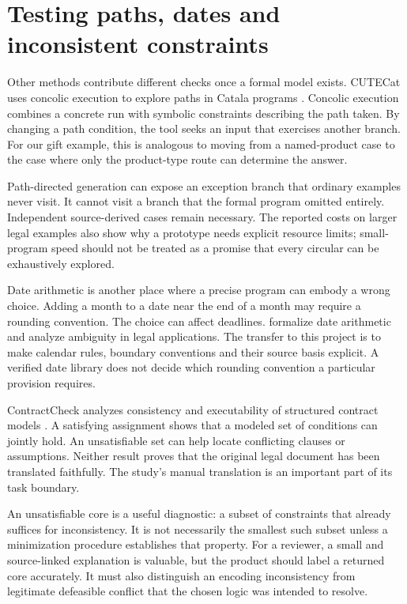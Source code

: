 \documentclass[12pt,a4paper,oneside,openany]{book}
\begin{document}
\section{Testing paths, dates and inconsistent constraints}
\label{sec:languages-analysis}
Other methods contribute different checks once a formal model exists.
CUTECat uses concolic execution to explore paths in Catala programs
\citep[secs.~2--5]{cutecat2025}. Concolic execution combines a concrete run
with symbolic constraints describing the path taken. By changing a path
condition, the tool seeks an input that exercises another branch. For our
gift example, this is analogous to moving from a named-product case to the
case where only the product-type route can determine the answer.

Path-directed generation can expose an exception branch that ordinary
examples never visit. It cannot visit a branch that the formal program
omitted entirely. Independent source-derived cases remain necessary. The
reported costs on larger legal examples also show why a prototype needs
explicit resource limits; small-program speed should not be treated as a
promise that every circular can be exhaustively explored.

Date arithmetic is another place where a precise program can embody a wrong
choice. Adding a month to a date near the end of a month may require a
rounding convention. The choice can affect deadlines. \citet{dates2024}
formalize date arithmetic and analyze ambiguity in legal applications. The
transfer to this project is to make calendar rules, boundary conventions and
their source basis explicit. A verified date library does not decide which
rounding convention a particular provision requires.

ContractCheck analyzes consistency and executability of structured contract
models \citep[secs.~3--8]{contractcheck2025}. A satisfying assignment shows
that a modeled set of conditions can jointly hold. An unsatisfiable set can
help locate conflicting clauses or assumptions. Neither result proves that
the original legal document has been translated faithfully. The study's
manual translation is an important part of its task boundary.

An unsatisfiable core is a useful diagnostic: a subset of constraints that
already suffices for inconsistency. It is not necessarily the smallest such
subset unless a minimization procedure establishes that property. For a
reviewer, a small and source-linked explanation is valuable, but the product
should label a returned core accurately. It must also distinguish an
encoding inconsistency from legitimate defeasible conflict that the chosen
logic was intended to resolve.
\end{document}
